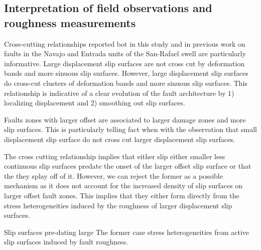 \documentclass[12pt,a4paper]{article}
\begin{document}
\subsection{Interpretation of field observations and roughness measurements}

Cross-cutting relationships reported bot in this study and in previous work on faults in the Navajo and Entrada units of the San-Rafael swell are particularly informative. Large displacement slip surfaces are not cross cut by deformation bands and more sinuous slip surfaces. However, large displacement slip surfaces do cross-cut clusters of deformation bands and more sinuous slip surfaces. This relationship is indicative of a clear evolution of the fault architecture by 1) localizing displacement and 2) smoothing out slip surfaces. 

Faults zones with larger offset are associated to larger damage zones and more slip surfaces. This is particularly telling fact when with the observation that small displacement slip surface do not cross cut larger displacement slip surfaces. 

The cross cutting relationship implies that either slip either smaller less continuous slip surfaces predate the onset of the larger offset slip surface or that the they splay off of it. However, we can reject the former as a possible mechanism as it does not account for the increased density of slip surfaces on larger offset fault zones.  This implies that they either form directly from the stress heterogeneities induced by the roughness of larger displacement slip surfaces. 

Slip surfaces pre-dating large The former case  stress heterogeneities from active slip surfaces induced by fault roughness.


\end{document}
